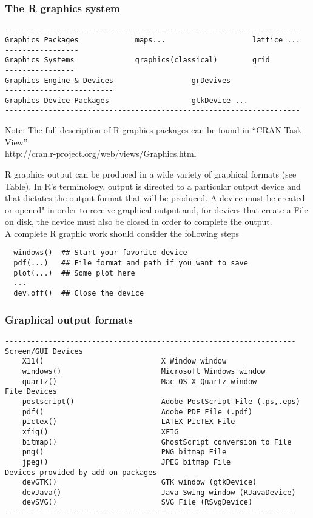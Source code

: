\documentclass[10pt]{beamer}
\begin{document}
\begin{frame}[fragile]
\frametitle{The R graphics system}
\begin{verbatim}
--------------------------------------------------------------------
Graphics Packages             maps...                    lattice ...
-----------------
Graphics Systems              graphics(classical)        grid
----------------
Graphics Engine & Devices                  grDevives
-------------------------
Graphics Device Packages                   gtkDevice ...
--------------------------------------------------------------------
\end{verbatim}
Note: The full description of R graphics packages can be found in ``CRAN Task View''\\
\url{http://cran.r-project.org/web/views/Graphics.html}
\end{frame}


\begin{frame}[fragile]

R graphics output can be produced in a wide variety of graphical formats (see Table).
In R's terminology, output is directed to a particular output device and that
dictates the output format that will be produced. A device must be created or
opened" in order to receive graphical output and, for devices that create a File
on disk, the device must also be closed in order to complete the output. \\

A complete R graphic work should consider the following steps
\begin{verbatim}
  windows()  ## Start your favorite device
  pdf(...)   ## File format and path if you want to save
  plot(...)  ## Some plot here
  ...
  dev.off()  ## Close the device
\end{verbatim}
\end{frame}


\begin{frame}[fragile]
\frametitle{Graphical output formats}

\begin{verbatim}
-------------------------------------------------------------------
Screen/GUI Devices
    X11()                           X Window window
    windows()                       Microsoft Windows window
    quartz()                        Mac OS X Quartz window
File Devices
    postscript()                    Adobe PostScript File (.ps,.eps)
    pdf()                           Adobe PDF File (.pdf)
    pictex()                        LATEX PicTEX File
    xfig()                          XFIG
    bitmap()                        GhostScript conversion to File
    png()                           PNG bitmap File
    jpeg()                          JPEG bitmap File
Devices provided by add-on packages
    devGTK()                        GTK window (gtkDevice)
    devJava()                       Java Swing window (RJavaDevice)
    devSVG()                        SVG File (RSvgDevice)
-------------------------------------------------------------------
\end{verbatim}
\end{frame}
\end{document}
